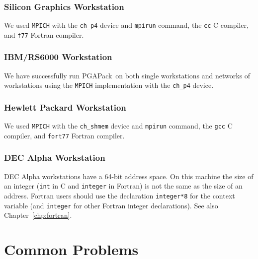 \documentclass{report}
\newcommand{\pga}{PGAPack}
\begin{document}
\subsection*{Silicon Graphics Workstation}

We used {\tt MPICH} with the {\tt ch\_p4} device and {\tt mpirun} command, the
{\tt cc} C compiler, and {\tt f77} Fortran compiler.

\subsection*{IBM/RS6000 Workstation}

We have successfully run \pga\ on both single workstations and networks of
workstations using the {\tt MPICH} implementation with the {\tt ch\_p4}
device.

\subsection*{Hewlett Packard Workstation}

We used {\tt MPICH} with the {\tt ch\_shmem} device and {\tt mpirun} command,
the {\tt gcc} C compiler, and {\tt fort77} Fortran compiler.

\subsection*{DEC Alpha Workstation}

DEC Alpha workstations have a 64-bit address space.
On this machine the size of an integer ({\tt int} in C and {\tt integer} in
Fortran) is not the same as the size of an address.  Fortran users should use
the declaration {\tt integer*8} for the context variable (and {\tt integer}
for other Fortran integer declarations).
See also Chapter~\ref{chp:fortran}.







\chapter{Common Problems}\label{chp:problems}
\end{document}
